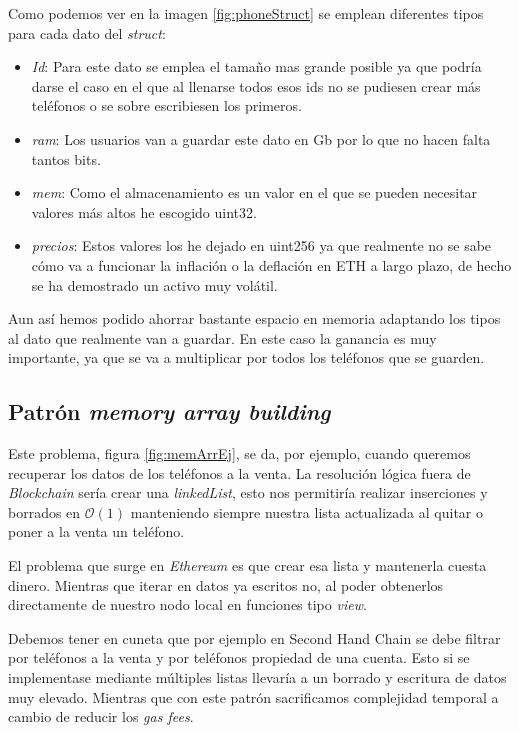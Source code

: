 Como podemos ver en la imagen \ref{fig:phoneStruct} se emplean diferentes tipos para cada dato del \textit{struct}:
\begin{itemize}
    \item  \textit{Id}: Para este dato se emplea el tamaño mas grande posible ya que podría darse el caso en el que al llenarse todos esos ids no se pudiesen crear más teléfonos o se sobre escribiesen los primeros.
    \item  \textit{ram}: Los usuarios van a guardar este dato en Gb por lo que no hacen falta tantos bits.
    \item  \textit{mem}: Como el almacenamiento es un valor en el que se pueden necesitar valores más altos he escogido uint32.
    \item  \textit{precios}: Estos valores los he dejado en uint256 ya que realmente no se sabe cómo va a funcionar la inflación o la deflación en ETH a largo plazo, de hecho se ha demostrado un activo muy volátil.
\end{itemize}

Aun así hemos podido ahorrar bastante espacio en memoria adaptando los tipos al dato que realmente van a guardar. En este caso la ganancia es muy importante, ya que se va a multiplicar por todos los teléfonos que se guarden.

\subsection{Patrón \textit{memory array building}}

Este problema\cite{memoryarraybuilding}, figura \ref{fig:memArrEj}, se da, por ejemplo, cuando queremos recuperar los datos de los teléfonos a la venta. La resolución lógica fuera de \textit{Blockchain} sería crear una \textit{linkedList}\cite{bigocheatsheetBigOAlgorithm}, esto nos permitiría realizar inserciones y borrados en $\mathcal{O}(1)$ manteniendo siempre nuestra lista actualizada al quitar o poner a la venta un teléfono.


El problema que surge en \textit{Ethereum} es que crear esa lista y mantenerla cuesta dinero. Mientras que iterar en datos ya escritos no, al poder obtenerlos directamente de nuestro nodo local en funciones tipo \textit{view}.

Debemos tener en cuneta que por ejemplo en Second Hand Chain se debe filtrar por teléfonos a la venta y por teléfonos propiedad de una cuenta. Esto si se implementase mediante múltiples listas llevaría a un borrado y escritura de datos muy elevado. Mientras que con este patrón sacrificamos complejidad temporal a cambio de reducir los \textit{gas fees}.

